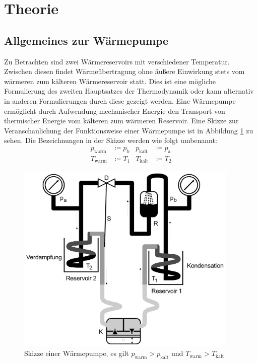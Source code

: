 \section{Theorie}
\label{sec:Theorie}
\subsection{Allgemeines zur Wärmepumpe}
Zu Betrachten sind zwei Wärmereservoirs mit verschiedener Temperatur.
Zwischen diesen findet Wärmeübertragung ohne äußere Einwirkung stets vom
wärmeren zum kälteren Wärmereservoir statt. Dies ist eine mögliche Formulierung des
zweiten Hauptsatzes der Thermodynamik oder kann alternativ in anderen Formulierungen
durch diese gezeigt werden. \newline
Eine Wärmepumpe ermöglicht durch Aufwendung mechanischer Energie den Transport von
thermischer Energie vom kälteren zum wärmeren Reservoir.
Eine Skizze zur Veranschaulichung der Funktionsweise einer Wärmepumpe ist in
Abbildung \ref{fig:waermepumpebild} zu sehen. Die Bezeichnungen in der Skizze werden
wie folgt umbenannt:
\begin{align}
p_\text{warm} &\coloneqq p_\text{b} & p_\text{kalt} &\coloneqq p_\text{a} \\
T_\text{warm} &\coloneqq T_1 & T_\text{kalt} &\coloneqq T_2
\end{align}

\begin{figure}
  \centering
  \includegraphics[width=300pt]{data/waermepumpe.png}
  \caption{Skizze einer Wärmepumpe, es gilt $p_\text{warm} > p_\text{kalt}$ und $T_\text{warm} > T_\text{kalt}$ \cite{Versuchsanleitung}}
  \label{fig:waermepumpebild}
\end{figure}

